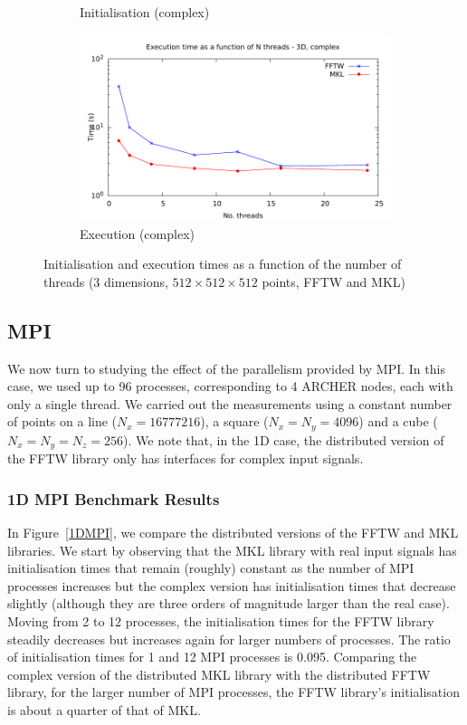 \documentclass[12pt, a4paper]{article} \setlength{\textheight}{24cm}
\begin{document}
\begin{figure}[H]
\begin{subfigure}{.5\textwidth}
    \caption{Initialisation (complex)}
    \label{3DMULTHCI}
  \end{subfigure}%
  \begin{subfigure}{.5\textwidth}
    \centering
    \includegraphics[width=.9\linewidth]{graphs/3d-multh-exec-c.pdf}
    \caption{Execution (complex)}
    \label{3DMULTHCR}
  \end{subfigure}
  \caption{Initialisation and execution times as a function of the
    number of threads (3 dimensions, $512 \times 512\times 512$
    points, FFTW and MKL)}
  \label{3DMTHREAD}
\end{figure}

\subsection{MPI}\label{MPI}
We now turn to studying the effect of the parallelism provided by MPI.
In this case, we used up to 96 processes, corresponding to 4 ARCHER
nodes, each with only a single thread. We carried out the measurements
using a constant number of points on a line ($N_x=16777216$), a square
($N_x=N_y=4096$) and a cube ($N_x=N_y=N_z=256$). We note that, in the
1D case, the distributed version of the FFTW library only has
interfaces for complex input signals.


\subsubsection{1D MPI Benchmark Results}
In Figure~\ref{1DMPI}, we compare the distributed versions of the FFTW
and MKL libraries. We start by observing that the MKL library with
real input signals has initialisation times that remain (roughly)
constant as the number of MPI processes increases but the complex
version has initialisation times that decrease slightly (although they
are three orders of magnitude larger than the real case). Moving from
2 to 12 processes, the initialisation times for the FFTW library
steadily decreases but increases again for larger numbers of
processes. The ratio of initialisation times for 1 and 12 MPI
processes is 0.095. Comparing the complex version of the distributed
MKL library with the distributed FFTW library, for the larger number
of MPI processes, the FFTW library's initialisation is about a quarter
of that of MKL.
\end{document}
